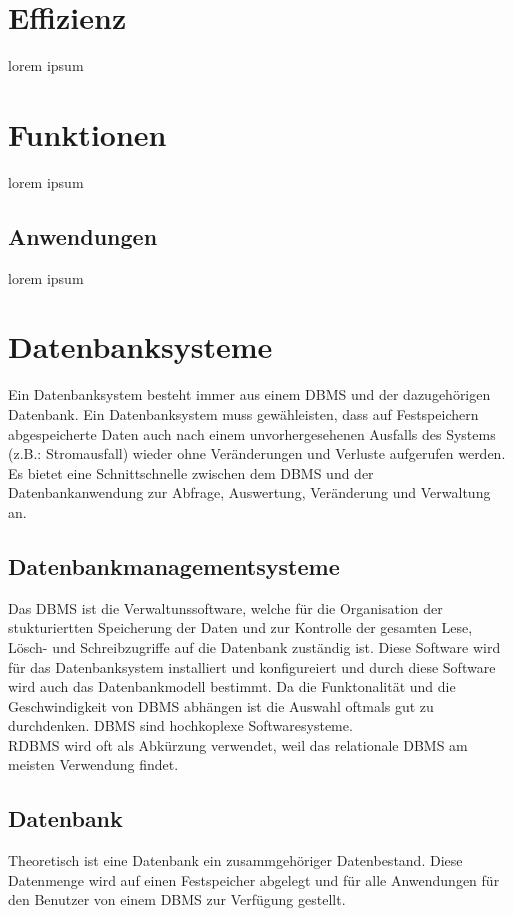 \documentclass[12pt,a4paper]{report}
\begin{document}
\section{Effizienz}
lorem ipsum
\section{Funktionen}
lorem ipsum
\subsection{Anwendungen}
lorem ipsum
\section{Datenbanksysteme}
Ein Datenbanksystem besteht immer aus einem DBMS und der dazugehörigen Datenbank. Ein Datenbanksystem muss gewähleisten, dass auf Festspeichern abgespeicherte Daten auch nach einem unvorhergesehenen Ausfalls des Systems (z.B.: Stromausfall) wieder ohne Veränderungen und Verluste aufgerufen werden.\\
Es bietet eine Schnittschnelle zwischen dem DBMS und der Datenbankanwendung zur  Abfrage, Auswertung, Veränderung und Verwaltung an.

\subsection{Datenbankmanagementsysteme}
Das DBMS ist die Verwaltunssoftware, welche für die Organisation der stukturiertten  Speicherung der Daten und zur Kontrolle der gesamten Lese, Lösch- und Schreibzugriffe auf die Datenbank zuständig ist.
Diese Software wird für das Datenbanksystem installiert und konfigureiert und durch diese Software wird auch das Datenbankmodell bestimmt.
Da die Funktonalität und die Geschwindigkeit von DBMS abhängen ist die Auswahl oftmals gut zu durchdenken.
DBMS sind hochkoplexe Softwaresysteme.\\

RDBMS wird oft als Abkürzung verwendet, weil das relationale DBMS am meisten Verwendung findet.

\subsection{Datenbank}
Theoretisch ist eine Datenbank ein zusammgehöriger Datenbestand. 
Diese Datenmenge wird auf einen Festspeicher abgelegt und für alle Anwendungen für den Benutzer von einem DBMS zur Verfügung gestellt.
\end{document}
